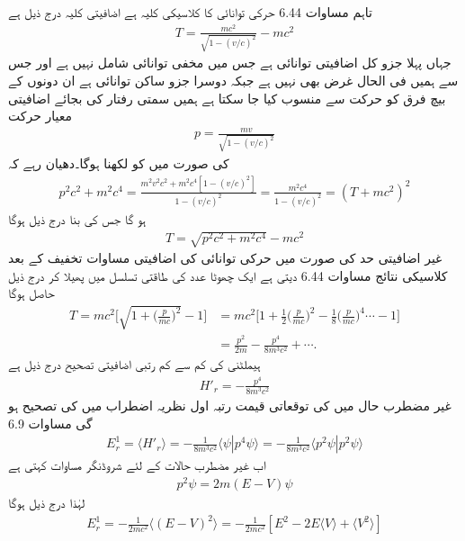 تاہم مساوات 6.44 حرکی توانائی کا کلاسیکی کلیہ ہے اضافیتی کلیہ درج ذیل ہے 
\begin{align}
T = \frac{mc^2}{\sqrt{1 - (v/c)^2}} - mc^2
\end{align}
جہاں پہلا جزو کل اضافیتی  توانائی ہے جس میں مخفی توانائی شامل نہیں ہے اور جس سے ہمیں فی الحال غرض بھی نہیں ہے جبکہ دوسرا جزو ساکن توانائی ہے ان دونوں کے بیچ فرق کو حرکت سے منسوب کیا جا سکتا ہے ہمیں سمتی رفتار کی بجائے  اضافیتی معیار حرکت
\begin{align}
p = \frac{mv}{\sqrt{1 - (v/c)^2}}
\end{align}
 کی صورت میں  کو لکھنا ہوگا۔دھیان رہے کہ
\begin{align*}
p^2 c^2 + m^2 c^4 = \frac{m^2 v^2 c^2 + m^2 c^4 [1 - (v/c)^2]}{1 - (v/c)^2} = \frac{m^2 c^4}{1 - (v/c)^2} = (T + mc^2)^2
\end{align*}
ہو گا جس کی بنا درج ذیل ہوگا 
\begin{align}
T = \sqrt{p^2 c^2 + m^2 c^4} - mc^2
\end{align}
غیر اضافیتی حد  کی صورت میں حرکی توانائی کی اضافیتی مساوات تخفیف کے بعد کلاسیکی نتائج مساوات 6.44 دیتی ہے ایک چھوٹا عدد  کی طاقتی تسلسل میں پھیلا کر درج ذیل حاصل ہوگا 
\begin{align}
T = mc^2 \big [ \sqrt{1 + \big(\frac{p}{mc}\big)^2}  - 1 \big ] &= mc^2 \big [ 1 + \frac{1}{2} \big(\frac{p}{mc}\big)^2 - \frac{1}{8} \big(\frac{p}{mc}\big)^4 \cdots - 1 \big ] \nonumber \\
&= \frac{p^2}{2m} - \frac{p^4}{8m^3 c^2} + \cdots .
\end{align}
ہیملٹنی کی کم سے کم رتبی اضافیتی تصحیح درج ذیل ہے 
\begin{align}
H'_r = - \frac{p^4}{8m^3 c^2}
\end{align}
غیر مضطرب حال میں  کی توقعاتی قیمت رتبہ اول نظریہ اضطراب میں  کی تصحیح  ہو گی مساوات 6.9 
\begin{align}
E_r^1 = \langle H'_r \rangle = - \frac{1}{8 m^3 c^2} \langle \psi | p^4 \psi \rangle = - \frac{1}{8m^3 c^2} \langle p^2 \psi | p^2 \psi \rangle
\end{align}
اب غیر مضطرب حالات کے لئے شروڈنگر مساوات کہتی ہے 
\begin{align}
p^2 \psi = 2m (E - V) \psi
\end{align}
 لہٰذا   درج ذیل ہوگا 
\begin{align}
E_r^1 = - \frac{1}{2mc^2} \langle (E - V)^2 \rangle = - \frac{1}{2mc^2} [E^2 - 2E \langle V \rangle + \langle V^2 \rangle]
\end{align}
